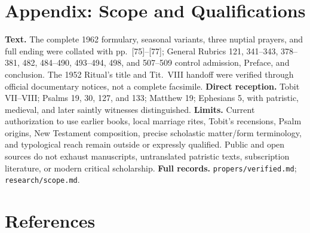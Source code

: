 \section*{Appendix: Scope and Qualifications}

\begin{studyframe}
\footnotesize
\textbf{Text.} The complete 1962 formulary, seasonal variants, three nuptial prayers, and full ending were collated with pp.~[75]--[77]; General Rubrics 121, 341--343, 378--381, 482, 484--490, 493--494, 498, and 507--509 control admission, Preface, and conclusion. The 1952 Ritual's title and Tit.~VIII handoff were verified through official documentary notices, not a complete facsimile. \textbf{Direct reception.} Tobit VII--VIII; Psalms 19, 30, 127, and 133; Matthew 19; Ephesians 5, with patristic, medieval, and later saintly witnesses distinguished. \textbf{Limits.} Current authorization to use earlier books, local marriage rites, Tobit's recensions, Psalm origins, New Testament composition, precise scholastic matter/form terminology, and typological reach remain outside or expressly qualified. Public and open sources do not exhaust manuscripts, untranslated patristic texts, subscription literature, or modern critical scholarship. \textbf{Full records.} \nolinkurl{propers/verified.md}; \nolinkurl{research/scope.md}.
\end{studyframe}

\section*{References}

